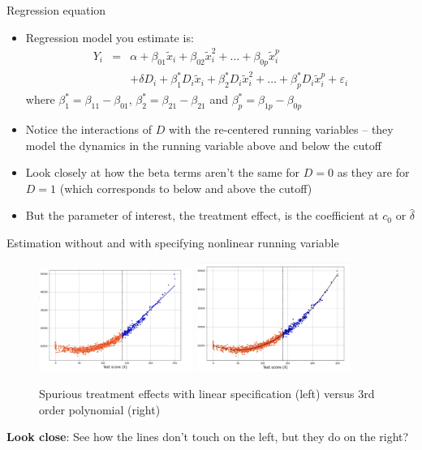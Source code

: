 \documentclass{beamer}
\begin{document}
\begin{frame}{Regression equation}

\begin{itemize}
	\item Regression model you estimate is:
		\begin{eqnarray*}
		Y_i &=& \alpha + \beta_{01}\tilde{x}_i + \beta_{02}\tilde{x}_i^2 + \dots + \beta_{0p}\tilde{x}_i^p \\
		& & + \delta{D}_i + \beta_1^*D_i\tilde{x}_i + \beta_2^*D_i\tilde{x}_i^2 + \dots + \beta_p^*D_i\tilde{x}_i^p + \varepsilon_i 
		\end{eqnarray*}where $\beta^*_1 = \beta_{11} - \beta_{01}$, $\beta_2^* = \beta_{21} - \beta_{21}$ and $\beta_p^*=\beta_{1p}-\beta_{0p}$
	\item Notice the interactions of $D$ with the re-centered running variables -- they model the dynamics in the running variable above and below the cutoff
	\item Look closely at how the beta terms aren't the same for $D=0$ as they are for $D=1$ (which corresponds to below and above the cutoff)
	\item But the parameter of interest, the treatment effect, is the coefficient at $c_0$ or $\widehat{\delta}$
\end{itemize}

\end{frame}


\begin{frame}{Estimation without and with specifying nonlinear running variable}
\begin{figure}
    \centering
    \includegraphics[width=5cm]{./lecture_includes/linear_estimation.png}
    \qquad
    \includegraphics[width=5cm]{./lecture_includes/nonlinear_estimation.png}
    \caption{Spurious treatment effects with linear specification (left) versus 3rd order polynomial (right)}
\end{figure}

\textbf{Look close}: See how the lines don't touch on the left, but they do on the right?  

\end{frame}
\end{document}
